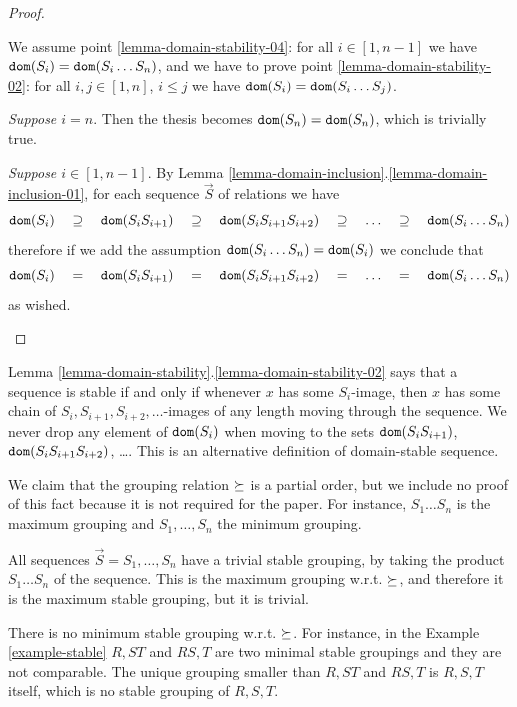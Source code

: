 \documentclass{lmcs}
\begin{document}
\begin{proof}
\begin{enumerate}
We assume point \ref{lemma-domain-stability-04}: 
for all $i \in [1, n-1]$ we have ${\tt dom}(S_i) =  {\tt dom}(S_i \ldots S_n)$, and we have to prove
point \ref{lemma-domain-stability-02}: 
for all $i, j \in [1, n]$, $i \le j$ we have ${\tt dom}(S_i) =  {\tt dom}(S_i \ldots S_j)$.

\emph{Suppose $i=n$}. 
Then the thesis becomes ${\tt dom}(S_n) =  {\tt dom}(S_n)$, which is trivially true.

\emph{Suppose $i \in [1,n-1]$}.
By Lemma \ref{lemma-domain-inclusion}.\ref{lemma-domain-inclusion-01},
for each sequence $\vec{S}$ of relations we have 
$$
\dom(S_i)  \ \ \ \supseteq \ \ \ 
\dom(S_iS_{i+1})  \ \ \  \supseteq \ \ \ 
\dom(S_iS_{i+1}S_{i+2})  \ \ \  \supseteq  \ \ \ 
\ldots  \ \ \  \supseteq  \ \ \ 
\dom(S_i \ldots S_n)
$$ 
therefore if we add the assumption ${\tt dom}(S_i \ldots S_n) = {\tt dom}(S_i)$ we conclude that
$$
\dom(S_i)   \ \ \ =  \ \ \ 
\dom(S_iS_{i+1})  \ \ \  =  \ \ \ 
\dom(S_iS_{i+1}S_{i+2})   \ \ \ =  \ \ \ 
\ldots   \ \ \ =  \ \ \ 
\dom(S_i \ldots S_n)
$$ 
as wished.
 
\end{enumerate}
\end{proof}




Lemma \ref{lemma-domain-stability}.\ref{lemma-domain-stability-02}
says that a sequence is stable if and only if whenever $x$ has some $S_i$-image,
then $x$ has some chain of $S_i, S_{i+1}, S_{i+2}, \ldots$-images of any length
moving through the sequence. We never drop any element of ${\tt dom}(S_i)$
when moving to the sets ${\tt dom}(S_i S_{i+1})$, ${\tt dom}(S_i S_{i+1} S_{i+2})$, \ldots.
This is an alternative definition of domain-stable sequence.





We claim that the grouping relation ${\succeq}$ is a partial order, but we include
no proof of this fact because it is not required for the paper. For instance, 
$S_1 \ldots S_n$ is the maximum grouping and $S_1, \ldots, S_n$ the minimum grouping.

All sequences $\vec{S}=S_1, \ldots, S_n$ have a trivial stable grouping, by taking the
product $S_1 \ldots S_n$ of the sequence. This is the maximum grouping w.r.t. ${\succeq}$, 
and therefore it is the maximum stable grouping, but it is trivial. 

There is no minimum
stable grouping w.r.t. ${\succeq}$. For instance,
in the Example \ref{example-stable} $R,ST$ and $RS,T$
are two minimal stable groupings and they are not comparable. The unique grouping smaller
than $R,ST$ and $RS,T$ is $R,S,T$ itself, which is no stable grouping of $R,S,T$.
\end{document}
